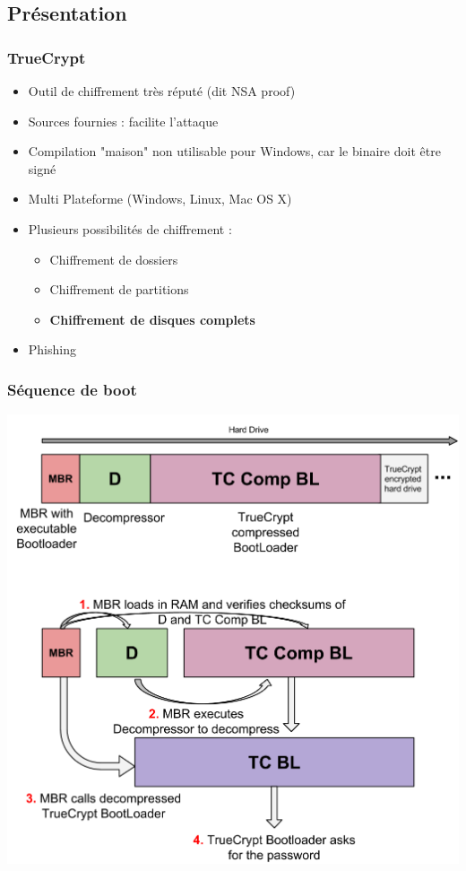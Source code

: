 \documentclass[red]{beamer}
\begin{document}
\subsection{Présentation}
\begin{frame}
    \frametitle{TrueCrypt}
    \begin{itemize}
        \item Outil de chiffrement très réputé (dit NSA proof)
        \item Sources fournies : facilite l'attaque
        \item Compilation "maison" non utilisable pour Windows, car
        le binaire doit être signé
        \item Multi Plateforme (Windows, Linux, Mac OS X)
        \item Plusieurs possibilités de chiffrement :
        \begin{itemize}
            \item Chiffrement de dossiers
            \item Chiffrement de partitions
            \item \textbf{Chiffrement de disques complets}
        \end{itemize}
        \item Phishing
    \end{itemize}
\end{frame}

\begin{frame}
    \frametitle{Séquence de boot}
    \vspace{-0.6cm}
    \begin{center}
        \includegraphics[height=0.85\textheight]{img/tc_boot.png}
    \end{center}
\end{frame}
\end{document}
